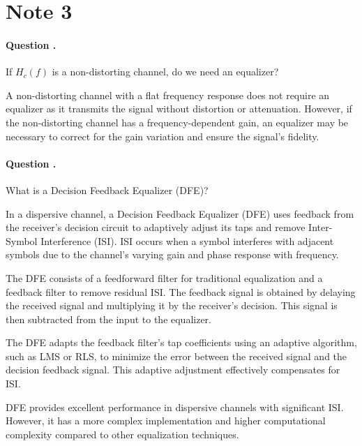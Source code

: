 \documentclass[14pt,a4paper]{report}
\newcounter{question}
\newcommand*\question{%
\stepcounter{question}%
\paragraph{Question \thesection.\thequestion}}
\begin{document}
\section{Note 3}
\question
{
    If $H_c(f)$ is a non-distorting channel, do we need an equalizer?
}
\begin{answer_box*}
    A non-distorting channel with a flat frequency response does not require an equalizer as it transmits the signal without distortion or attenuation. However, if the non-distorting channel has a frequency-dependent gain, an equalizer may be necessary to correct for the gain variation and ensure the signal's fidelity.
\end{answer_box*}

\question
{
    What is a Decision Feedback Equalizer (DFE)?
}
\begin{answer_box*}
In a dispersive channel, a Decision Feedback Equalizer (DFE) uses feedback from the receiver's decision circuit to adaptively adjust its taps and remove Inter-Symbol Interference (ISI). ISI occurs when a symbol interferes with adjacent symbols due to the channel's varying gain and phase response with frequency.

The DFE consists of a feedforward filter for traditional equalization and a feedback filter to remove residual ISI. The feedback signal is obtained by delaying the received signal and multiplying it by the receiver's decision. This signal is then subtracted from the input to the equalizer.

The DFE adapts the feedback filter's tap coefficients using an adaptive algorithm, such as LMS or RLS, to minimize the error between the received signal and the decision feedback signal. This adaptive adjustment effectively compensates for ISI.

DFE provides excellent performance in dispersive channels with significant ISI. However, it has a more complex implementation and higher computational complexity compared to other equalization techniques.
\end{answer_box*}
\end{document}
